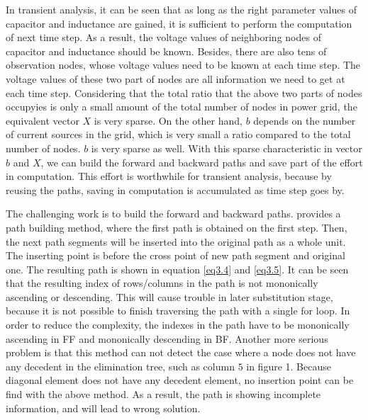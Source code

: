 In transient analysis, it can be seen that as long as the right parameter values of capacitor and inductance are gained, it is 
sufficient to 
perform the computation of next time step. As a result, the voltage values of neighboring nodes of capacitor and inductance should be 
known. Besides, there are also tens of observation nodes, whose voltage values need to be known at each time step. The voltage values of
these two part of nodes are all information we need to get at each time step. Considering that the
total ratio that the above two parts of nodes occupyies is only a small amount of the total number of nodes in power grid, the equivalent
vector $X$ is very sparse. On the other hand, $b$ depends on the number of current sources in the grid, which is very small a ratio 
compared to the total number of nodes. $b$ is very sparse as well. With this sparse characteristic in vector $b$ and $X$, we can build the
forward and backward paths and save part of the effort in computation. This effort is worthwhile for transient analysis, because by 
reusing the paths, saving in computation is accumulated as time step goes by.

The challenging work is to build the forward and backward paths. \cite{Tinney} provides a path building method, where the first path is 
obtained on the first step. Then, the next path segments will be inserted into the original path as a whole unit. The inserting point is 
before the cross point of new path segment and original one. The resulting path is shown in equation \eqref{eq3.4} and \eqref{eq3.5}. It
can be seen that the resulting index of rows/columns in the path is not mononically ascending or descending. This will cause trouble in
later substitution stage, because it is not possible to finish traversing the path with a single for loop. In order to reduce the 
complexity, the indexes in the path have to be mononically ascending in FF and mononically descending in BF. Another more serious problem
is that this method can not detect the case where a node does not have any decedent in the elimination tree, such as column $5$ in figure 
1. Because diagonal element does not have any decedent element, no insertion point can be find with the above method. As a result, the 
path is showing incomplete information, and will lead to wrong solution. 

